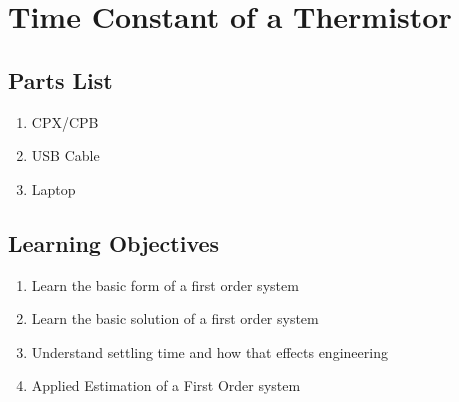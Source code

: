 \newpage

\section{Time Constant of a Thermistor}
\label{s:time_constant}
\label{s:thermistor}

\subsection{Parts List}

\begin{enumerate}[itemsep=-5pt]
\item CPX/CPB
\item USB Cable
\item Laptop
\end{enumerate}

\subsection{Learning Objectives}
\begin{enumerate}[itemsep=-5pt]
\item Learn the basic form of a first order system
\item Learn the basic solution of a first order system
\item Understand settling time and how that effects engineering
\item Applied Estimation of a First Order system
\end{enumerate}

